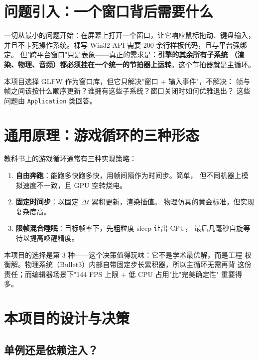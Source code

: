 \section{问题引入：一个窗口背后需要什么}

一切从最小的问题开始：在屏幕上打开一个窗口，让它响应鼠标拖动、键盘输入，
并且不卡死操作系统。裸写 Win32 API 需要 200 余行样板代码，且与平台强绑定。
但"跨平台窗口"只是表象——真正的需求是：\textbf{引擎的其余所有子系统
（渲染、物理、音频）都必须挂在一个统一的节拍器上运转}。这个节拍器就是主循环。

本项目选择 GLFW 作为窗口库，但它只解决"窗口 + 输入事件"，不解决：
帧与帧之间该按什么顺序更新？谁拥有这些子系统？窗口关闭时如何优雅退出？
这些问题由 \texttt{Application} 类回答。

\section{通用原理：游戏循环的三种形态}

教科书上的游戏循环通常有三种实现策略：

\begin{enumerate}
  \item \textbf{自由奔跑}：能跑多快跑多快，用帧间隔作为时间步。简单，
        但不同机器上模拟速度不一致，且 GPU 空转烧电。
  \item \textbf{固定时间步}：以固定 $\Delta t$ 累积更新，渲染插值。
        物理仿真的黄金标准，但实现复杂度高。
  \item \textbf{限帧混合睡眠}：目标帧率下，先粗粒度 sleep 让出 CPU，
        最后几毫秒自旋等待以提高唤醒精度。
\end{enumerate}

本项目的选择是第 3 种——这个决策值得玩味：它不是学术最优解，而是工程
权衡解。物理系统（Bullet3）内部自带固定步长累积器，所以主循环无需再背
这份责任；而编辑器场景下"144 FPS 上限 + 低 CPU 占用"比"完美确定性"
重要得多。

\section{本项目的设计与决策}

\subsection{单例还是依赖注入？}

